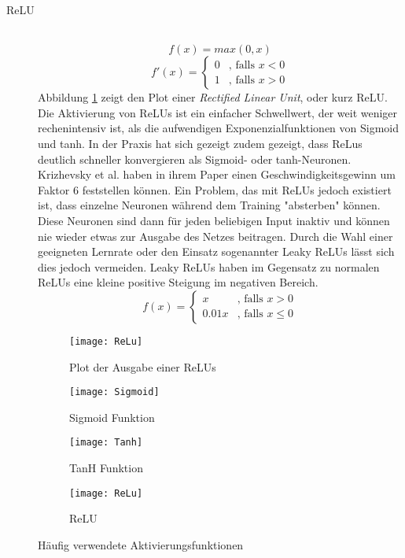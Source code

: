 \begin{description}
	\item[ReLU] \hfill \\
		\begin{equation}
			f(x) = max(0, x)
		\end{equation}
		\begin{equation*}
			f'(x) = \begin{cases}
			0 &\text{, falls $x < 0$}\\
			1 &\text{, falls $x > 0$}
			\end{cases}
		\end{equation*}
		Abbildung \ref{reluoutput} zeigt den Plot einer \textit{Rectified Linear Unit}, oder kurz ReLU.
		Die Aktivierung von ReLUs ist ein einfacher Schwellwert, der weit weniger rechenintensiv ist, als die aufwendigen Exponenzialfunktionen von Sigmoid und tanh.
		In der Praxis hat sich gezeigt zudem gezeigt, dass ReLus deutlich schneller konvergieren als Sigmoid- oder tanh-Neuronen. 
		Krizhevsky et al. haben in ihrem Paper\cite{NIPS2012_4824} einen Geschwindigkeitsgewinn um Faktor 6 feststellen können.
		Ein Problem, das mit ReLUs jedoch existiert ist, dass einzelne Neuronen während dem Training "absterben" können.
		Diese Neuronen sind dann für jeden beliebigen Input inaktiv und können nie wieder etwas zur Ausgabe des Netzes beitragen.
		Durch die Wahl einer geeigneten Lernrate oder den Einsatz sogenannter Leaky ReLUs lässt sich dies jedoch vermeiden.
		Leaky ReLUs haben im Gegensatz zu normalen ReLUs eine kleine positive Steigung im negativen Bereich.
		\begin{equation}
			f(x) = \begin{cases}
				x &\text{, falls } x  >  0\\
				0.01 x &\text{, falls } x  \leq  0
			\end{cases}
		\end{equation} 

		\begin{figure}
			\centering
			\texttt{[image: ReLu]}
			\caption{Plot der Ausgabe einer ReLUs}
			\label{reluoutput}
		\end{figure}



\end{description}

\begin{figure}[h]
    \centering
    \begin{subfigure}[t]{0.3\textwidth}
		\texttt{[image: Sigmoid]}
		\caption{Sigmoid Funktion}
    \end{subfigure}
    \begin{subfigure}[t]{0.3\textwidth}
		\texttt{[image: Tanh]}
		\caption{TanH Funktion}
    \end{subfigure}
    \begin{subfigure}[t]{0.3\textwidth}
        \texttt{[image: ReLu]}
        \caption{ReLU}
    \end{subfigure}
    \caption{Häufig verwendete Aktivierungsfunktionen}
    \label{eval:function}
\end{figure}


